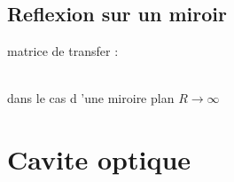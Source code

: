 \documentclass[12pt]{book}
\begin{document}
        \subsection{Reflexion sur un miroir}
            matrice de transfer :
            \begin{center}
                 \\ dans le cas d 'une miroire plan $R \to \infty$
            \end{center} 
    \section{Cavite optique}
\end{document}

